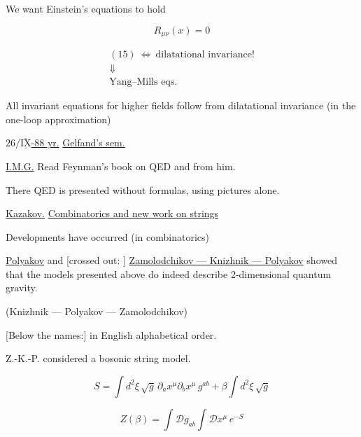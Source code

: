 We want Einstein's equations to hold

\begin{equation*}
R_{\mu\nu}(x)=0
\tag{15}
\end{equation*}

\begin{equation*}
\begin{gathered}
(15)\ \Leftrightarrow\ \text{dilatational invariance!}\\
\Downarrow\\
\text{Yang--Mills eqs.}
\end{gathered}
\end{equation*}

All invariant equations for higher fields follow from dilatational
invariance (in the one-loop approximation)


\underline{$26/\overline{\underline{\mathrm{IX}}}$-88 yr.}
\qquad \underline{\underline{Gelfand's sem.}}

\underline{I.M.G.} Read Feynman's book on QED and
from him.

There QED is presented without formulas, using pictures alone.

\underline{\underline{Kazakov.}}
\quad \underline{Combinatorics and new work on strings}

Developments have occurred (in combinatorics)

\underline{Polyakov} and
[crossed out: ]
\underline{Zamolodchikov --- Knizhnik --- Polyakov}
showed that the models presented above do indeed describe 2-dimensional
quantum gravity.

(Knizhnik --- Polyakov --- Zamolodchikov)

[Below the names:] in English alphabetical order.

Z.-K.-P. considered a bosonic string model.

\begin{equation*}
S=\int d^{2}\xi\,\sqrt{g}\,\partial_a x^{\mu}\partial_b x^{\mu}\,g^{ab}
+\beta\int d^{2}\xi\,\sqrt{g}
\tag{1}
\end{equation*}

\begin{equation*}
Z(\beta)=\int\mathcal{D}g_{ab}\int\mathcal{D}x^{\mu}\,e^{-S}
\tag{2}
\end{equation*}

